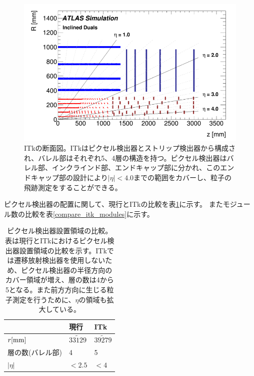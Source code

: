\begin{figure}[bpt]\centering
\includegraphics[width=12cm]{itk_cross_section}
\caption[ITkの断面図]{ITkの断面図\cite{1-3}。ITkはピクセル検出器とストリップ検出器から構成され、バレル部はそれぞれ5、4層の構造を持つ。ピクセル検出器はバレル部、インクラインド部、エンドキャップ部に分かれ、このエンドキャップ部の設計により$|\eta|<4.0$までの範囲をカバーし、粒子の飛跡測定をすることができる。}
\label{itk_cross_section}
\end{figure}

ピクセル検出器の配置に関して、現行とITkの比較を表\ref{compare_itk_pixel}に示す。
またモジュール数の比較を表\ref{compare_itk_modules}に示す。

\begin{table}[tbp]
\begin{center}
\caption[ピクセル検出器設置領域の比較]{ピクセル検出器設置領域の比較。表は現行とITkにおけるピクセル検出器設置領域の比較を示す。ITkでは遷移放射検出器を使用しないため、ピクセル検出器の半径方向のカバー領域が増え、層の数は4から5となる。また前方方向に生じる粒子測定を行うために、$\eta$の領域も拡大している。}
\label{compare_itk_pixel}
  \begin{tabular}{|lll|} \hline
    & 現行 & ITk \\ \hline
    $r[\rm{mm}]$ & $33\tilde129$ & $39\tilde279$ \\ 
    層の数(バレル部) & 4 & 5 \\ 
    $|\eta|$ & $<2.5$ & $<4$ \\ \hline
  \end{tabular}
\end{center}
\end{table}


